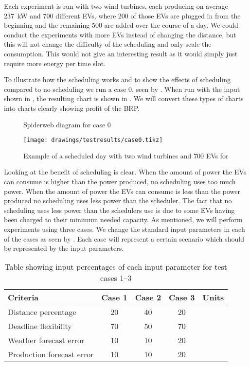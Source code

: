 Each experiment is run with two wind turbines, each producing on average \SI{237}{\kilo\watt} and 700 different EVs, where 200 of those EVs are plugged in from the beginning and the remaining 500 are added over the course of a day. We could conduct the experiments with more EVs instead of changing the distance, but this will not change the difficulty of the scheduling and only scale the consumption. This would not give an interesting result as it would simply just require more energy per time slot.

To illustrate how the scheduling works and to show the effects of scheduling compared to no scheduling we run a case 0, seen by . When run with the input shown in , the resulting chart is shown in . We will convert these types of charts into charts clearly showing profit of the BRP. 

\begin{figure}[!htbp]
	\centering
	
	\caption{Spiderweb diagram for case 0}\label{fig:case0spiderweb}
\end{figure}

\begin{figure}[!htb]
	\centering
	\texttt{[image: drawings/testresults/case0.tikz]}
  \caption{Example of a scheduled day with two wind turbines and \num{700} EVs for \protect{}}\label{fig:case0_chart}
\end{figure}
Looking at  the benefit of scheduling is clear. When the amount of power the EVs can consume is higher than the power produced, no scheduling uses too much power. When the amount of power the EVs can consume is less than the power produced no scheduling uses less power than the scheduler. The fact that no scheduling uses less power than the schedulers use is due to some EVs having been charged to their minimum needed capacity.    
As mentioned, we will perform experiments using three cases. We change the standard input parameters in each of the cases as seen by . Each case will represent a certain scenario which should be represented by the input parameters. 
\begin{table}[!htbp]
	\centering
	\begin{tabular}{l S S S s}\toprule
    Criteria                & {Case 1} & {Case 2} & {Case 3} & {Units} \\ \midrule
		Distance percentage       & 20     & 40     & 20 & \percent \\
		Deadline flexibility 			& 70     & 50     & 70 & \percent \\
		Weather forecast error 	  & 10     & 10     & 20 & \percent \\
		Production forecast error & 10     & 10     & 20 & \percent \\ \bottomrule
		\end{tabular}
	\caption{Table showing input percentages of each input parameter for test cases 1--3}\label{tab:caseinputs}
\end{table}

